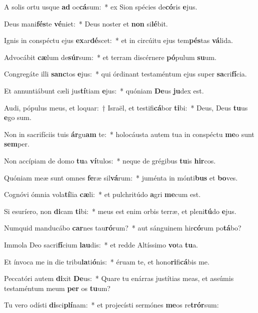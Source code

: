 \item A solis ortu usque \textbf{ad} oc\textbf{cá}sum:~* ex Sion spécies de\textbf{có}ris \textbf{e}jus.
\item Deus mani\textbf{fés}te \textbf{vé}niet:~* Deus noster et \textbf{non} si\textbf{lé}bit.
\item Ignis in conspéctu ejus \textbf{ex}ar\textbf{dé}scet:~* et in circúitu ejus tem\textbf{pés}tas \textbf{vá}lida.
\item Advocábit \textbf{cæ}lum de\textbf{súr}sum:~* et terram discérnere \textbf{pó}pulum \textbf{su}um.
\item Congregáte illi \textbf{sanc}tos \textbf{e}jus:~* qui órdinant testaméntum ejus super \textbf{sa}cri\textbf{fí}cia.
\item Et annuntiábunt cæli jus\textbf{tí}tiam \textbf{e}jus:~* quóniam \textbf{De}us \textbf{ju}dex est.
\item Audi, pópulus meus, et loquar:~† Israël, et testifi\textbf{cá}bor \textbf{ti}bi:~* Deus, Deus \textbf{tu}us \textbf{e}go sum.
\item Non in sacrifíciis tuis \textbf{ár}gu\textbf{am} te:~* holocáusta autem tua in conspéctu \textbf{me}o sunt \textbf{sem}per.
\item Non accípiam de domo \textbf{tu}a \textbf{ví}tulos:~* neque de grégibus \textbf{tu}is \textbf{hir}cos.
\item Quóniam meæ sunt omnes \textbf{fe}ræ sil\textbf{vá}rum:~* juménta in mónti\textbf{bus} et \textbf{bo}ves.
\item Cognóvi ómnia vola\textbf{tí}lia \textbf{cæ}li:~* et pulchritúdo \textbf{a}gri \textbf{me}cum est.
\item Si esuríero, non \textbf{di}cam \textbf{ti}bi:~* meus est enim orbis terræ, et pleni\textbf{tú}do \textbf{e}jus.
\item Numquid manducábo \textbf{car}nes tau\textbf{ró}rum?~* aut sánguinem hir\textbf{có}rum po\textbf{tá}bo?
\item Immola Deo sacri\textbf{fí}cium \textbf{lau}dis:~* et redde Altíssimo \textbf{vo}ta \textbf{tu}a.
\item Et ínvoca me in die tribu\textbf{la}ti\textbf{ó}nis:~* éruam te, et hono\textbf{ri}fi\textbf{cá}bis me.
\item Peccatóri autem \textbf{di}xit \textbf{De}us:~* Quare tu enárras justítias meas, et assúmis testaméntum meum \textbf{per} os \textbf{tu}um?
\item Tu vero odísti \textbf{di}sci\textbf{plí}nam:~* et projecísti sermónes \textbf{me}os re\textbf{trór}sum:
